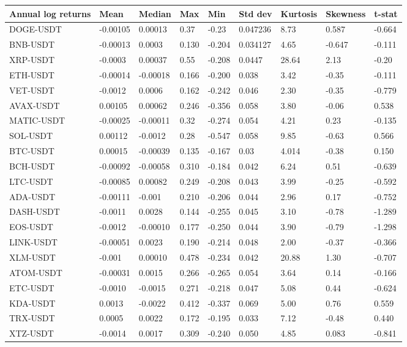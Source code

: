 \documentclass{article}
\begin{document}
\begin{table}[H]
  \centering
  \begin{tabular}{p{3cm}|p{1.5cm}|p{1.5cm}|p{1.5cm}|p{1.5cm}|p{1.5cm}|p{1.5cm}|p{1.5cm}|p{1.5cm}}%
    \toprule
    Annual log returns & Mean & Median & Max & Min & Std dev & Kurtosis & Skewness & t-stat \\%
    \midrule
    DOGE-USDT & -0.00105 & 0.00013 & 0.37 & -0.23 & 0.047236 & 8.73 & 0.587 & -0.664 \\
    BNB-USDT  & -0.00013 & 0.0003 & 0.130 & -0.204 & 0.034127 & 4.65 & -0.647 & -0.111 \\ 
    XRP-USDT &  -0.0003 & 0.00037 & 0.55 & -0.208 & 0.0447 & 28.64 & 2.13 & -0.20 \\
    ETH-USDT &  -0.00014 & -0.00018 & 0.166 & -0.200 & 0.038 & 3.42 & -0.35 & -0.111 \\  
    VET-USDT &  -0.0012 & 0.0006 & 0.162 & -0.242 & 0.046 & 2.30 & -0.35 & -0.779 \\  
    AVAX-USDT & 0.00105 & 0.00062 & 0.246 & -0.356 & 0.058 & 3.80 & -0.06 & 0.538 \\
    MATIC-USDT & -0.00025 & -0.00011 & 0.32 & -0.274 & 0.054 & 4.21 & 0.23 & -0.135 \\  
    SOL-USDT  & 0.00112 & -0.0012 & 0.28 & -0.547 & 0.058 & 9.85 & -0.63 & 0.566 \\  
    BTC-USDT  & 0.00015 & -0.00039 & 0.135 & -0.167 & 0.03 & 4.014 & -0.38 & 0.150 \\ 
    BCH-USDT & -0.00092 & -0.00058 & 0.310 & -0.184 & 0.042 & 6.24 & 0.51 & -0.639 \\  
    LTC-USDT & -0.00085 & 0.00082 & 0.249 & -0.208 & 0.043 & 3.99 & -0.25 & -0.592 \\  
    ADA-USDT & -0.00111 & -0.001 & 0.210 & -0.206 & 0.044 & 2.96 & 0.17 & -0.752 \\  
    DASH-USDT & -0.0011 & 0.0028 & 0.144 & -0.255 & 0.045 & 3.10 & -0.78 & -1.289 \\ 
    EOS-USDT & -0.0012 & -0.00010 & 0.177 & -0.250 & 0.044 & 3.90 & -0.79 & -1.298 \\  
    LINK-USDT &  -0.00051 & 0.0023 & 0.190 & -0.214 & 0.048 & 2.00 & -0.37 & -0.366 \\  
    XLM-USDT  & -0.001 & 0.00010 & 0.478 & -0.234 & 0.042 & 20.88 & 1.30 & -0.707 \\  
    ATOM-USDT & -0.00031 & 0.0015 & 0.266 & -0.265 & 0.054 & 3.64 & 0.14 & -0.166 \\ 
    ETC-USDT  & -0.0010 & -0.0015 & 0.271 & -0.218 & 0.047 & 5.08 & 0.44 & -0.624 \\  
    KDA-USDT  & 0.0013 & -0.0022 & 0.412 & -0.337 & 0.069 & 5.00 & 0.76 & 0.559\\  
    TRX-USDT &  0.0005 & 0.0022 & 0.172 & -0.195 & 0.033 & 7.12 & -0.48 & 0.440 \\   
    XTZ-USDT & -0.0014 & 0.0017 & 0.309 & -0.240 & 0.050 & 4.85 & 0.083 & -0.841\\


\end{tabular}
\end{table}
\end{document}
